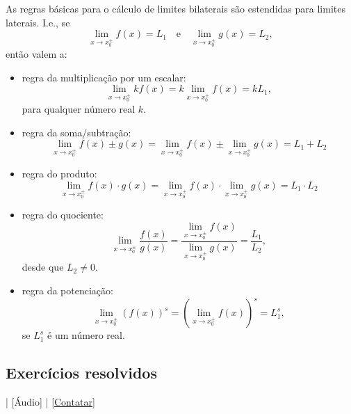 \begin{obs}
  As regras básicas para o cálculo de limites bilaterais são estendidas para limites laterais. I.e., se
  \begin{equation}
    \lim_{x\to x_0^{\pm}} f(x) = L_1\quad\text{e}\quad\lim_{x\to x_0^{\pm}} g(x) = L_2,
  \end{equation}
  então valem a:
  \begin{itemize}
\item regra da multiplicação por um escalar:
  \begin{equation}
    \lim_{x\to x_0^{\pm}} kf(x) = k\lim_{x\to x_0^{\pm}} f(x) = kL_1,
  \end{equation}
  para qualquer número real $k$.
\item regra da soma/subtração:
  \begin{equation}
    \lim_{x\to x_0^{\pm}} f(x) \pm g(x) = \lim_{x\to x_0^{\pm}} f(x) \pm \lim_{x\to x_0^{\pm}} g(x) = L_1 + L_2
  \end{equation}
\item regra do produto:
  \begin{equation}
    \lim_{x\to x_0^\pm} f(x) \cdot g(x) = \lim_{x\to x_0^\pm} f(x) \cdot \lim_{x\to x_0^\pm} g(x) = L_1 \cdot L_2
  \end{equation}
\item regra do quociente:
  \begin{equation}
    \lim_{x\to x_0^\pm} \frac{f(x)}{g(x)} = \frac{\lim_{x\to x_0^\pm} f(x)}{\lim_{x\to x_0^\pm} g(x)} = \frac{L_1}{L_2},
  \end{equation}
  desde que $L_2\neq 0$.
\item regra da potenciação:
  \begin{equation}
    \lim_{x\to x_0^\pm} (f(x))^s = \left(\lim_{x\to x_0^\pm} f(x) \right)^s = L_1^s,
  \end{equation}
  se $L_1^s$ é um número real.
\end{itemize}
\end{obs}

\subsection*{Exercícios resolvidos}

\begin{flushright}
  [Vídeo] | [Áudio] | \href{https://phkonzen.github.io/notas/contato.html}{[Contatar]}
\end{flushright}


